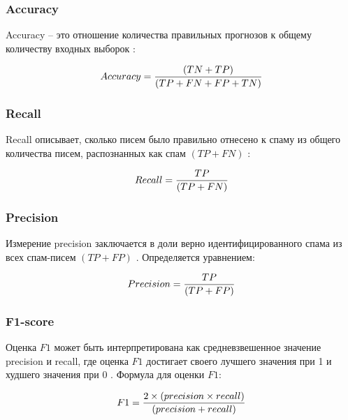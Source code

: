     \subsubsection{Accuracy}
    
        Accuracy -- это отношение количества правильных прогнозов к общему количеству входных 
        выборок \cite{scikitMetrics}:
        
        \begin{equation}\label{eq11}
            Accuracy = {{(TN + TP)} \over{(TP + FN + FP + TN)}}
        \end{equation}
    
    \subsubsection{Recall}
    
        Recall описывает, сколько писем было правильно отнесено к спаму из 
        общего количества писем, распознанных как спам $(TP + FN)$ \cite{scikitMetrics}:

        \begin{equation}\label{eq12}
            Recall = {{TP} \over{(TP + FN)}}
        \end{equation}
    
    \subsubsection{Precision}
    
        Измерение precision заключается в доли верно идентифицированного 
        спама из всех спам-писем $(TP + FP)$ \cite{scikitMetrics}. Определяется 
        уравнением:

        \begin{equation}\label{eq13}
            Precision = {{TP} \over{(TP + FP)}}
        \end{equation}
    
    \subsubsection{F1-score}
    
        Оценка $F1$ может быть интерпретирована как средневзвешенное 
        значение precision и recall, где оценка $F1$ достигает своего лучшего 
        значения при 1 и худшего значения при 0 \cite{scikitMetrics}.
        Формула для оценки $F1$:

        \begin{equation}\label{eq14}
            F1 = {2 \times (precision \times recall) \over{(precision + recall)}}
        \end{equation}


